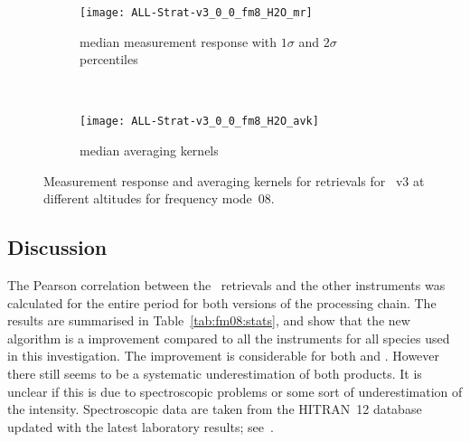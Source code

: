 \begin{figure}[tbhp]
    \centering
    \begin{subfigure}[b]{0.49\textwidth}
        \texttt{[image: ALL-Strat-v3\_0\_0\_fm8\_H2O\_mr]}
        \caption{median measurement response with $1\sigma$ and $2\sigma$
        percentiles}
        \label{fig:fm08:H2O:mr}
    \end{subfigure}
    \,
    \begin{subfigure}[b]{0.49\textwidth}
        \texttt{[image: ALL-Strat-v3\_0\_0\_fm8\_H2O\_avk]}
        \caption{median averaging kernels\newline~}
        \label{fig:fm08:H2O:avk}
    \end{subfigure}
    \caption{Measurement response and averaging kernels for 
    retrievals for \smr~v3 at different altitudes for frequency mode~08.}
    \label{fig:fm08:H2O:mr_avk}
\end{figure}


\subsection{Discussion}
\label{sec:fm08:discussion}
The Pearson correlation between the \smr\ retrievals and the other instruments
was calculated for the entire period for both versions of the processing chain.
The results are summarised in Table~\ref{tab:fm08:stats}, and show that the
new algorithm is a improvement compared to all the instruments for all species
used in this investigation. The improvement is considerable for both 
and . However there still seems to be a systematic underestimation
of both products. It is unclear if this is due to spectroscopic problems or
some sort of underestimation of the intensity.  Spectroscopic data are taken
from the HITRAN~12 database updated with the latest laboratory results;
see~\cite{atbdl2}.



